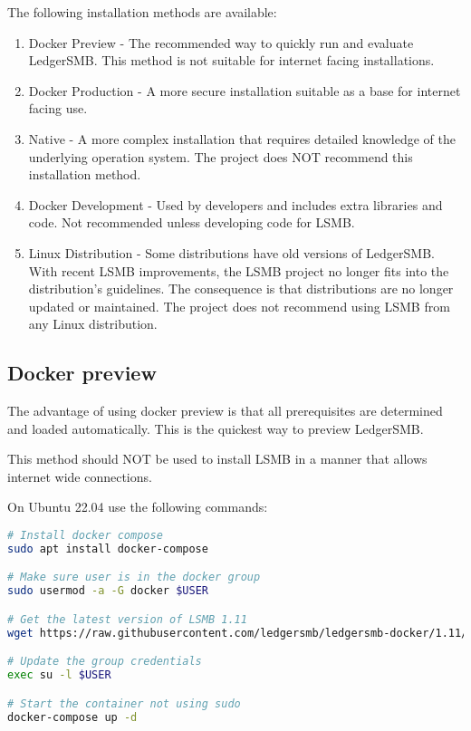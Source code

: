 The following installation methods are available:
\begin{enumerate}
    \item Docker Preview - The recommended way to quickly run and evaluate LedgerSMB. 
        This method is not suitable for internet facing installations.
    \item Docker Production - A more secure installation suitable as a base for internet facing use.
    \item Native - A more complex installation that requires detailed knowledge of the underlying operation system. 
        The project does NOT recommend this installation method.
    \item Docker Development - Used by developers and includes extra libraries and code. 
        Not recommended unless developing code for LSMB.
    \item Linux Distribution - Some distributions have old versions of LedgerSMB. With recent LSMB improvements, the LSMB project no longer fits into the distribution's guidelines.
        The consequence is that distributions are no longer updated or maintained.
        The project does not recommend using LSMB from any Linux distribution.
\end{enumerate}

\subsection{Docker preview}
\label{sub-installation-docker-preview}

The advantage of using docker preview is that all prerequisites are determined and loaded automatically. 
This is the quickest way to preview LedgerSMB.

This method should NOT be used to install LSMB in a manner that allows internet wide connections.

On Ubuntu 22.04 use the following commands:
\begin{lstlisting}[language=bash, basicstyle=\ttfamily, breaklines=true,frame=none,backgroundcolor=\color{ghostwhite}]
# Install docker compose
sudo apt install docker-compose

# Make sure user is in the docker group
sudo usermod -a -G docker $USER

# Get the latest version of LSMB 1.11
wget https://raw.githubusercontent.com/ledgersmb/ledgersmb-docker/1.11/docker-compose.yml

# Update the group credentials
exec su -l $USER

# Start the container not using sudo
docker-compose up -d
\end{lstlisting}

